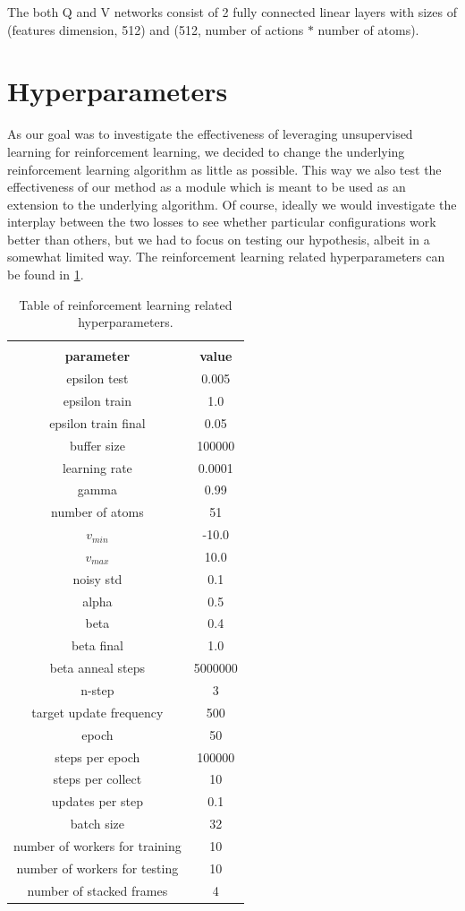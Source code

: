 The both Q and V networks consist of 2 fully connected linear layers
with sizes of (features dimension, 512) and (512, number of actions $ *  $ number of atoms).

\section{Hyperparameters}
As our goal was to investigate the effectiveness of leveraging unsupervised learning
for reinforcement learning, we decided to change the underlying reinforcement learning
algorithm as little as possible.
This way we also test the effectiveness of our method as a module which is meant
to be used as an extension to the underlying algorithm.
Of course, ideally we would investigate the interplay between the two losses
to see whether particular configurations work better than others,
but we had to focus on testing our hypothesis, albeit in a somewhat limited way.
The reinforcement learning related hyperparameters can be found in \ref{table-rl-hyperparams}. \\

\begin{table}[htpb]
		\centering
		\caption{Table of reinforcement learning related hyperparameters.}
		\label{table-rl-hyperparams}
		\begin{tabular}{| c | c | }
\hline \\
\textbf{parameter} & \textbf{value} \\ \hline
epsilon test & 0.005 \\
epsilon train & 1.0 \\
epsilon train final & 0.05 \\
buffer size & 100000 \\
learning rate & 0.0001 \\
gamma & 0.99 \\
number of atoms & 51 \\
$v_{min}$ & -10.0 \\
$v_{max}$ & 10.0 \\
noisy std & 0.1 \\
alpha & 0.5 \\
beta & 0.4 \\
beta final & 1.0 \\
beta anneal steps & 5000000 \\
n-step & 3 \\
target update frequency & 500 \\
epoch & 50 \\
steps per epoch & 100000 \\
steps per collect & 10 \\
updates per step & 0.1 \\
batch size & 32 \\
number of workers for training & 10 \\
number of workers for testing & 10 \\
number of stacked frames & 4\\
				\hline
		\end{tabular}
\end{table}


